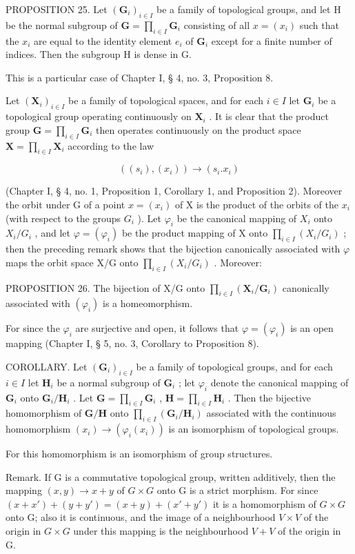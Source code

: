 PROPOSITION 25. Let \((\mathbf{G}_{i})_{i\in I}\) be a family of topological groups, and let H be the normal subgroup of \(\mathbf{G} = \prod_{i\in I}\mathbf{G}_i\) consisting of all \(x = (x_{i})\) such that the \(x_{i}\) are equal to the identity element \(e_i\) of \(\mathbf{G}_i\) except for a finite number of indices. Then the subgroup H is dense in G.

This is a particular case of Chapter I, § 4, no. 3, Proposition 8.

Let \((\mathbf{X}_i)_{i \in I}\) be a family of topological spaces, and for each \(i \in I\) let \(\mathbf{G}_i\) be a topological group operating continuously on \(\mathbf{X}_i\) . It is clear that the product group \(\mathbf{G} = \prod_{i \in I} \mathbf{G}_i\) then operates continuously on the product space \(\mathbf{X} = \prod_{i \in I} \mathbf{X}_i\) according to the law

\[
\left(\left(s _ {i}\right), \left(x _ {i}\right)\right)\rightarrow \left(s _ {i}. x _ {i}\right)
\]

(Chapter I, § 4, no. 1, Proposition 1, Corollary 1, and Proposition 2). Moreover the orbit under G of a point \(x = (x_{i})\) of X is the product of the orbits of the \(x_{i}\) (with respect to the groups \(G_{i}\) ). Let \(\varphi_{i}\) be the canonical mapping of \(X_{i}\) onto \(X_{i}/G_{i}\) , and let \(\varphi = (\varphi_{i})\) be the product mapping of X onto \(\prod_{i\in I}(X_{i}/G_{i})\) ; then the preceding remark shows that the bijection canonically associated with \(\varphi\) maps the orbit space X/G onto \(\prod_{i\in I}(X_{i}/G_{i})\) . Moreover:

PROPOSITION 26. The bijection of X/G onto \(\prod_{i\in I}(\mathbf{X}_i / \mathbf{G}_i)\) canonically associated with \((\varphi_i)\) is a homeomorphism.

For since the \(\varphi_{i}\) are surjective and open, it follows that \(\varphi = (\varphi_{i})\) is an open mapping (Chapter I, § 5, no. 3, Corollary to Proposition 8).

COROLLARY. Let \((\mathbf{G}_{i})_{i\in I}\) be a family of topological groups, and for each \(i\in I\) let \(\mathbf{H}_i\) be a normal subgroup of \(\mathbf{G}_i\) ; let \(\varphi_i\) denote the canonical mapping of \(\mathbf{G}_i\) onto \(\mathbf{G}_i / \mathbf{H}_i\) . Let \(\mathbf{G} = \prod_{i\in I}\mathbf{G}_i\) , \(\mathbf{H} = \prod_{i\in I}\mathbf{H}_i\) . Then the bijective homomorphism of \(\mathbf{G} / \mathbf{H}\) onto \(\prod_{i\in I}(\mathbf{G}_i / \mathbf{H}_i)\) associated with the continuous homomorphism \((x_i)\to (\varphi_i(x_i))\) is an isomorphism of topological groups.

For this homomorphism is an isomorphism of group structures.

Remark. If G is a commutative topological group, written additively, then the mapping \((x,y)\to x+y\) of \(G\times G\) onto G is a strict morphism. For since \((x+x')+(y+y')=(x+y)+(x'+y')\) it is a homomorphism of \(G\times G\) onto G; also it is continuous, and the image of a neighbourhood \(V\times V\) of the origin in \(G\times G\) under this mapping is the neighbourhood \(V+V\) of the origin in G.

